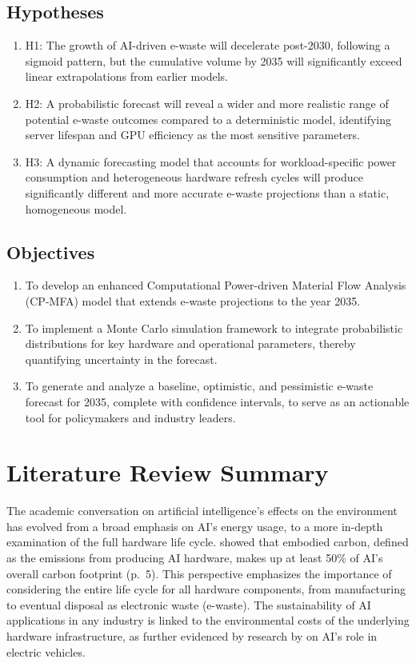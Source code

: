 \documentclass[a4paper, 12pt]{article}
\begin{document}
\subsection*{Hypotheses}
\begin{enumerate}
	\item H1: The growth of AI-driven e-waste will decelerate post-2030, following a sigmoid pattern, but the cumulative volume by 2035 will significantly exceed linear extrapolations from earlier models.
	\item H2: A probabilistic forecast will reveal a wider and more realistic range of potential e-waste outcomes compared to a deterministic model, identifying server lifespan and GPU efficiency as the most sensitive parameters.
	\item H3: A dynamic forecasting model that accounts for workload-specific power consumption and heterogeneous hardware refresh cycles will produce significantly different and more accurate e-waste projections than a static, homogeneous model.
\end{enumerate}

\subsection*{Objectives}
\begin{enumerate}
	\item To develop an enhanced Computational Power-driven Material Flow Analysis (CP-MFA) model that extends e-waste projections to the year 2035.
	\item To implement a Monte Carlo simulation framework to integrate probabilistic distributions for key hardware and operational parameters, thereby quantifying uncertainty in the forecast.
	\item To generate and analyze a baseline, optimistic, and pessimistic e-waste forecast for 2035, complete with confidence intervals, to serve as an actionable tool for policymakers and industry leaders.
\end{enumerate}

\section{Literature Review Summary}
The academic conversation on artificial intelligence's effects on the environment has evolved from a broad emphasis on AI's energy usage, to a more in-depth examination of the full hardware life cycle. \citet{Wu2022} showed that embodied carbon, defined as the emissions from producing AI hardware, makes up at least 50\% of AI's overall carbon footprint (p.~5). This perspective emphasizes the importance of considering the entire life cycle for all hardware components, from manufacturing to eventual disposal as electronic waste (e-waste). The sustainability of AI applications in any industry is linked to the environmental costs of the underlying hardware infrastructure, as further evidenced by research by \citet{M.rauf2024} on AI's role in electric vehicles. 
\end{document}
